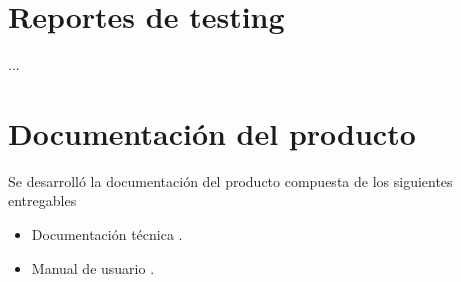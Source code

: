 \section{Reportes de testing}

...


\section{Documentación del producto }

Se desarrolló la documentación del producto compuesta de los siguientes entregables
\begin{itemize}
	\item Documentación técnica \cite{Robot_Tecnical_doc}.
	\item Manual de usuario \cite{Robot_User_manual}.
\end{itemize}











